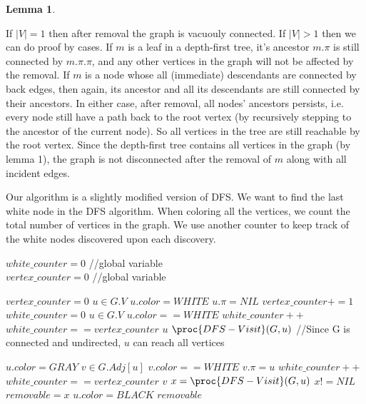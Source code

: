 \documentclass[11pt, answers]{exam}
\theoremstyle{plain}
\newtheorem{lemma}{Lemma}
\theoremstyle{definition}
\begin{document}
\begin{questions}
\begin{solution}
\begin{lemma}
\end{lemma}
If $|V| = 1$ then after removal the graph is vacuouly connected. If $|V| >1$ then we can do proof by cases. If $m$ is a leaf in a depth-first tree, it's ancestor $m.\pi$ is still connected by $m.\pi.\pi$, and any other vertices in the graph will not be affected by the removal. If $m$ is a node whose all (immediate) descendants are connected by back edges, then again, its ancestor and all its descendants are still connected by their ancestors. In either case, after removal, all nodes' ancestors persists, i.e. every node still have a path back to the root vertex (by recursively stepping to the ancestor of the current node). So all vertices in the tree are still reachable by the root vertex. Since the depth-first tree contains all vertices in the graph (by lemma 1), the graph is not disconnected after the removal of $m$ along with all incident edges.

Our algorithm is a slightly modified version of DFS. We want to find the last white node in the DFS algorithm.
When coloring all the vertices, we count the total number of vertices in the graph. We use another counter to keep track of the white nodes discovered upon each discovery. 

\begin{codebox}
 $white\_counter = 0$ //{global variable} \\
 $vertex\_counter = 0$ //{global variable}
\end{codebox}
\begin{codebox}
\li $vertex\_counter = 0$
\li {} $u \in G.V$ \Do
\li     $u.color = WHITE$
\li     $u.\pi = NIL$
\li     $vertex\_counter += 1$ \End
\li $white\_counter = 0$
\li {} $u \in G.V$ \Do
\li     \If $u.color == WHITE$ \Then 
\li         $white\_counter ++$
\li         \If $white\_counter == vertex\_counter$ \Then
\li             \Return $u$\End
\li         \Return $\proc{DFS-Visit}(G,u)$ //{Since G is connected and undirected, $u$ can reach all vertices}
\End\End
\end{codebox}
\begin{codebox}
\li $u.color =GRAY$
\li {} $v \in G.Adj[u]$ \Do
\li     \If $v.color == WHITE$ \Then
\li         $v.\pi = u$
\li         $white\_counter++$
\li         \If $white\_counter == vertex\_counter$ \Then
\li             \Return $v$
\li         \Else 
\li             $x = \proc{DFS-Visit}(G,u)$
\li             \If $x != NIL$ \Then
\li                 $removable = x$ \End\End\End\End
\li $u.color = BLACK$
\li \Return $removable$
\end{codebox}


\end{solution}
\end{questions}
\end{document}
